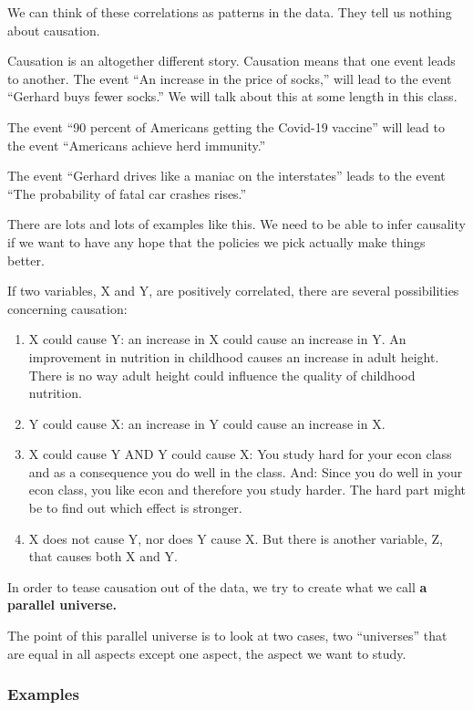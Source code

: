 \documentclass[
]{book}
\providecommand{\tightlist}{%
  \setlength{\itemsep}{0pt}\setlength{\parskip}{0pt}}
\begin{document}
We can think of these correlations as patterns in the data. They tell us nothing about causation.

Causation is an altogether different story. Causation means that one event leads to another. The event ``An increase in the price of socks,'' will lead to the event ``Gerhard buys fewer socks.'' We will talk about this at some length in this class.

The event ``90 percent of Americans getting the Covid-19 vaccine'' will lead to the event ``Americans achieve herd immunity.''

The event ``Gerhard drives like a maniac on the interstates'' leads to the event ``The probability of fatal car crashes rises.''

There are lots and lots of examples like this. We need to be able to infer causality if we want to have any hope that the policies we pick actually make things better.

If two variables, X and Y, are positively correlated, there are several possibilities concerning causation:

\begin{enumerate}
\def\labelenumi{\arabic{enumi}.}
\tightlist
\item
  X could cause Y: an increase in X could cause an increase in Y. An improvement in nutrition in childhood causes an increase in adult height. There is no way adult height could influence the quality of childhood nutrition.
\item
  Y could cause X: an increase in Y could cause an increase in X.
\item
  X could cause Y AND Y could cause X: You study hard for your econ class and as a consequence you do well in the class. And: Since you do well in your econ class, you like econ and therefore you study harder. The hard part might be to find out which effect is stronger.
\item
  X does not cause Y, nor does Y cause X. But there is another variable, Z, that causes both X and Y.
\end{enumerate}

In order to tease causation out of the data, we try to create what we call \textbf{a parallel universe.}

The point of this parallel universe is to look at two cases, two ``universes'' that are equal in all aspects except one aspect, the aspect we want to study.

\hypertarget{examples-1}{%
\subsubsection{Examples}\label{examples-1}}
\end{document}
